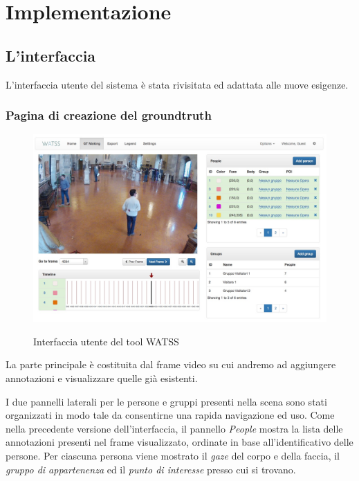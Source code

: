\section{Implementazione}

\subsection{L'interfaccia}

L'interfaccia utente del sistema è stata rivisitata ed adattata alle nuove esigenze. 

\subsubsection{Pagina di creazione del groundtruth}

\begin{figure}
\begin{center}
\centering
\includegraphics[width=1\linewidth]{images/watss-gui.jpg}
  \label{fig:watss-gui}
  \caption{Interfaccia utente del tool WATSS}
\end{center}
\end{figure}

La parte principale è costituita dal frame video su cui andremo ad aggiungere annotazioni e visualizzare quelle già esistenti.

I due pannelli laterali per le persone e gruppi presenti nella scena sono stati organizzati in modo tale da consentirne una rapida navigazione ed uso. Come nella precedente versione dell'interfaccia, il pannello \emph{People} mostra la lista delle annotazioni presenti nel frame visualizzato, ordinate in base all'identificativo delle persone. Per ciascuna persona viene mostrato il \emph{gaze }del corpo e della faccia, il \emph{gruppo di appartenenza} ed il \emph{punto di interesse} presso cui si trovano. 

